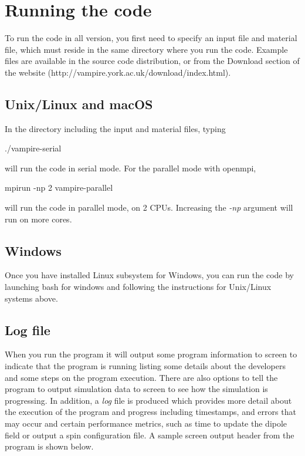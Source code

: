 %
%
%
%
\chapter{Running the code}
To run the code in all version, you first need to specify an input file and
material file, which must reside in the same directory where you run the code.
Example files are available in the source code distribution, or from the
Download section of the website (http://vampire.york.ac.uk/download/index.html).

\section*{Unix/Linux and macOS}
In the directory including the input and material files, typing

\noindent
\begin{minipage}[c]{\textwidth}
\centering
./vampire-serial
\end{minipage}

\noindent will run the code in serial mode. For the parallel mode with openmpi,

\noindent
\begin{minipage}[c]{\textwidth}
\centering
mpirun -np 2 vampire-parallel
\end{minipage}

\noindent will run the code in parallel mode, on 2 CPUs. Increasing the
\textit{-np} argument will run on more cores.

\section*{Windows}
Once you have installed Linux subsystem for Windows, you can run the code by
launching bash for windows and following the instructions for Unix/Linux systems
above.

\section*{Log file}
When you run the program it will output some program information to screen to
indicate that the program is running listing some details about the developers
and some steps on the program execution. There are also options to tell the
program to output simulation data to screen to see how the simulation is
progressing. In addition, a \textit{log} file is produced which provides more
detail about the execution of the program and progress including timestamps,
and errors that may occur and certain performance metrics, such as time to
update the dipole field or output a spin configuration file. A sample screen
output header from the program is shown below.

